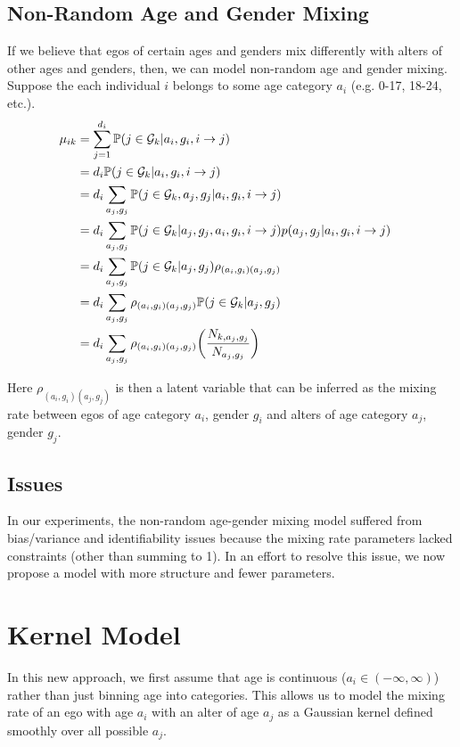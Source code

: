 \documentclass[12pt]{article}
\begin{document}
\subsection{Non-Random Age and Gender Mixing}
If we believe that egos of certain ages and genders mix differently with alters of other ages and genders, then, we can model non-random age and gender mixing. Suppose the each individual $i$ belongs to some age category $a_i$ (e.g. 0-17, 18-24, etc.).
\begin{align}
\mu_{ik} 
&= \sum_{j=1}^{d_i} \mathbb{P}( j \in \mathcal{G}_k | a_i, g_i, i \to j ) && \\\nonumber
&= d_i \mathbb{P}( j \in \mathcal{G}_k | a_i, g_i, i \to j) && \\\nonumber
&= d_i \sum_{a_j,g_j} \mathbb{P}( j \in \mathcal{G}_k, a_j, g_j | a_i, g_i, i \to j) && \\\nonumber
&= d_i \sum_{a_j,g_j} \mathbb{P}( j \in \mathcal{G}_k | a_j, g_j, a_i, g_i, i \to j) p(a_j, g_j | a_i, g_i, i \to j) && \\\nonumber
&= d_i \sum_{a_j,g_j} \mathbb{P}( j \in \mathcal{G}_k | a_j, g_j) \rho_{(a_i,g_i)(a_j,g_j)} && \\\nonumber
&= d_i \sum_{a_j,g_j} \rho_{(a_i,g_i)(a_j,g_j)} \mathbb{P}( j \in \mathcal{G}_k | a_j, g_j)  && \\\nonumber
&= d_i \sum_{a_j,g_j} \rho_{(a_i,g_i)(a_j,g_j)} \biggl( \frac{N_{k,a_j,g_j}}{N_{a_j,g_j}} \biggr)
\end{align}

\noindent Here $\rho_{(a_i,g_i)(a_j,g_j)}$ is then a latent variable that can be inferred as the mixing rate between egos of age category $a_i$, gender $g_i$ and alters of age category $a_j$, gender $g_j$.

\subsection{Issues}
In our experiments, the non-random age-gender mixing model suffered from bias/variance and identifiability issues because the mixing rate parameters lacked constraints (other than summing to 1). In an effort to resolve this issue, we now propose a model with more structure and fewer parameters.

\section{Kernel Model}
In this new approach, we first assume that age is continuous ($a_i \in (-\infty,\infty)$) rather than just binning age into categories. This allows us to model the mixing rate of an ego with age $a_i$ with an alter of age $a_j$ as a Gaussian kernel defined smoothly over all possible $a_j$.\\
\end{document}
